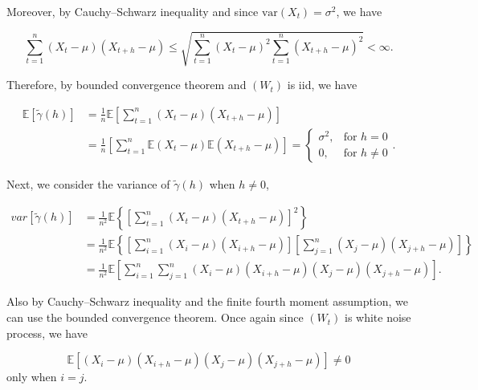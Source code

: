 \documentclass[]{book}
\theoremstyle{definition}
\theoremstyle{definition}
\theoremstyle{definition}
\theoremstyle{remark}
\begin{document}
Moreover, by Cauchy--Schwarz inequality and since
\(\text{var}(X_t) = \sigma^2\), we have

\[
\sum\limits_{t = 1}^{n} {\left( {{X_t} - \mu} \right)\left( {{X_{t + h}} - \mu} \right)} \leq \sqrt{\sum\limits_{t = 1}^{n} {\left( {{X_t} - \mu} \right)^2} \sum\limits_{t = 1}^{n} {\left( {{X_{t + h}} - \mu} \right)^2}} < \infty.
\]

Therefore, by bounded convergence theorem and \((W_t)\) is iid, we have

\[\begin{aligned}
    \mathbb{E}[\tilde{\gamma} \left( h \right)] &= \frac{1}{n}\mathbb{E}\left[\sum\limits_{t = 1}^{n} {\left( {{X_t} - \mu} \right)\left( {{X_{t + h}} - \mu} \right)}\right]\\
    &= \frac{1}{n}\left[\sum\limits_{t = 1}^{n} { \mathbb{E}\left( {{X_t} - \mu} \right)\mathbb{E}\left( {{X_{t + h}} - \mu} \right)}\right] =
    \begin{cases}
        \sigma^2, & \text{for } h = 0\\
        0, & \text{for } h \neq 0
    \end{cases}.
    \end{aligned}
\]

Next, we consider the variance of \(\tilde{\gamma} \left( h \right)\)
when \(h \neq 0\),

\[
\begin{aligned}
        var[\tilde{\gamma} \left( h \right)] &= \frac{1}{n^2}\mathbb{E}\left\{\left[\sum\limits_{t = 1}^{n} {\left( {{X_t} - \mu} \right)\left( {{X_{t + h}} - \mu} \right)}\right]^2\right\}\\
        &= \frac{1}{n^2}\mathbb{E}\left\{\left[\sum\limits_{i = 1}^{n} {\left( {{X_i} - \mu} \right)\left( {{X_{i + h}} - \mu} \right)}\right] \left[\sum\limits_{j = 1}^{n} {\left( {{X_j} - \mu} \right)\left( {{X_{j + h}} - \mu} \right)}\right]\right\}\\
        &= \frac{1}{n^2}\mathbb{E}\left[\sum\limits_{i = 1}^{n}\sum\limits_{j = 1}^{n} {\left( {{X_i} - \mu} \right)\left( {{X_{i + h}} - \mu} \right)}{\left( {{X_j} - \mu} \right)\left( {{X_{j + h}} - \mu} \right)}\right].
    \end{aligned}
\]

Also by Cauchy--Schwarz inequality and the finite fourth moment
assumption, we can use the bounded convergence theorem. Once again since
\((W_t)\) is white noise process, we have

\[
\mathbb{E}\left[{\left( {{X_i} - \mu} \right)\left( {{X_{i + h}} - \mu} \right)}{\left( {{X_j} - \mu} \right)\left( {{X_{j + h}} - \mu} \right)}\right] \neq 0
\] only when \(i = j\).
\end{document}
